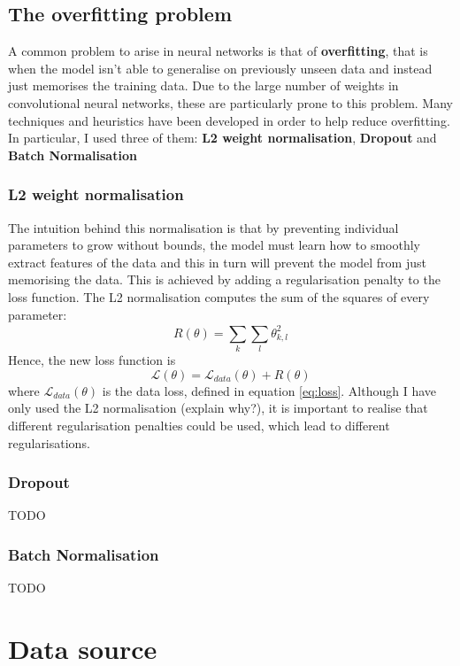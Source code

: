 \documentclass[12pt,a4paper,twoside,openright]{report}
\begin{document}
\subsection{The overfitting problem}
A common problem to arise in neural networks is that of \textbf{overfitting}, that is when the model isn't able to generalise on previously unseen data and instead just memorises the training data. Due to the large number of weights in convolutional neural networks, these are particularly prone to this problem. Many techniques and heuristics have been developed in order to help reduce overfitting. In particular, I used three of them: \textbf{L2 weight normalisation}, \textbf{Dropout} and \textbf{Batch Normalisation}
\subsubsection{\textbf{L2} weight normalisation}
The intuition behind this normalisation is that by preventing individual parameters to grow without bounds, the model must learn how to smoothly extract features of the data and this in turn will prevent the model from just memorising the data. This is achieved by adding a regularisation penalty to the loss function. The L2 normalisation computes the sum of the squares of every parameter:
\begin{equation}
	R(\theta) = \sum_{k}^{} \sum_{l}^{} \theta_{k,l}^2
\end{equation} 
Hence, the new loss function is
\begin{equation}
	\mathcal{L}(\theta) = \mathcal{L}_{data}(\theta) + R(\theta) 
\end{equation}
where $\mathcal{L}_{data}(\theta)$ is the data loss, defined in equation \ref{eq:loss}. 
Although I have only used the L2 normalisation (explain why?), it is important to realise that different regularisation penalties could be used, which lead to different regularisations.
\subsubsection{Dropout}
TODO
\subsubsection{Batch Normalisation}
TODO
\section{Data source}
\end{document}
